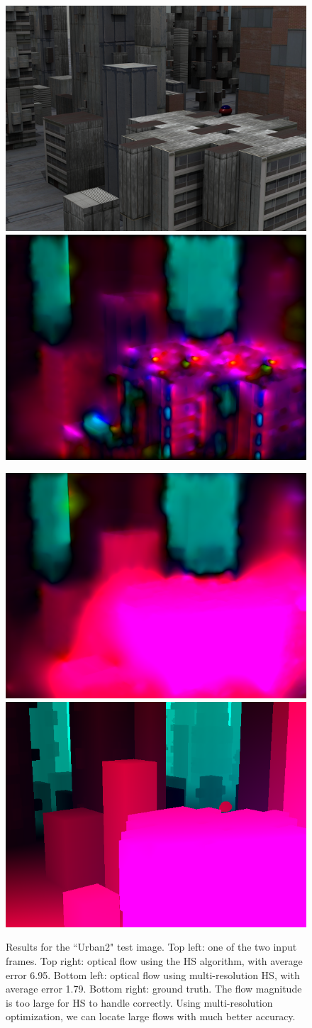 \documentclass[10pt,twocolumn,letterpaper]{article}
\begin{document}
\begin{figure}
\includegraphics[width=0.48 \columnwidth] {urban2_input.png} 
\includegraphics[width=0.48 \columnwidth] {urban2.png}

\includegraphics[width=0.48 \columnwidth] {urban2_multires.png} 
\includegraphics[width=0.48 \columnwidth] {urban2_truth.png} 

\caption{Results for the ``Urban2" test image.  Top left: one of the two input frames.  Top right: optical flow using the HS algorithm, with average error 6.95.  Bottom left: optical flow using multi-resolution HS, with average error 1.79.  Bottom right: ground truth.  The flow magnitude is too large for HS to handle correctly.  Using multi-resolution optimization, we can locate large flows with much better accuracy.}
\label{fig:urban2}
\end{figure}
\end{document}
